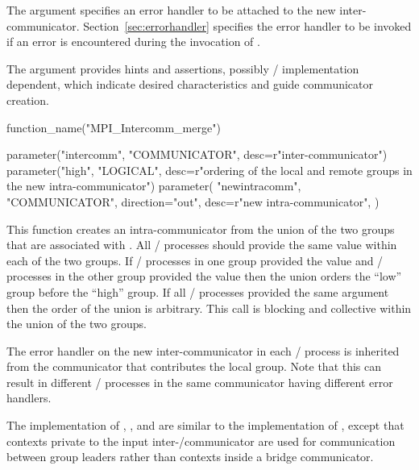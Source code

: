The  argument specifies an
error handler to be attached to the new inter-communicator.
Section~\ref{sec:errorhandler} specifies the error handler to be invoked 
if an error is encountered during the invocation of .

The  argument provides hints and assertions,
possibly \MPI/ implementation dependent,
which indicate desired characteristics and guide communicator creation.


%
\begin{mpi-binding}
    function_name("MPI_Intercomm_merge")
    
    parameter("intercomm", "COMMUNICATOR", desc=r"inter-communicator")
    parameter("high", "LOGICAL", desc=r"ordering of the local and remote groups in the new intra-communicator")
    parameter(
        "newintracomm",
        "COMMUNICATOR",
        direction="out",
        desc=r"new intra-communicator",
    )
\end{mpi-binding}

\noindent This
function creates an intra-communicator from the union of
the two groups that are associated with .
All \MPI/ processes should provide the same
 value within each of the two groups. If \MPI/ processes in one group
provided the value  and \MPI/ processes in the other group
provided the value  then the union orders the ``low'' group
before the ``high'' group. If all \MPI/ processes provided the same 
argument then the order of the union is arbitrary.
This call is blocking and collective within the union of
the two groups.

The error handler on the new inter-communicator in each \MPI/ process is inherited
from the communicator that contributes the local group. Note that this can
result in different \MPI/ processes in the same communicator having different error
handlers.

\begin{implementors} The implementation of
,\flushline
{}, and  are
similar to the implementation of\flushline
{}, except
that contexts private to the input inter\hyphen/communicator
are used for
communication between group leaders rather than contexts inside a
bridge communicator. \end{implementors}

